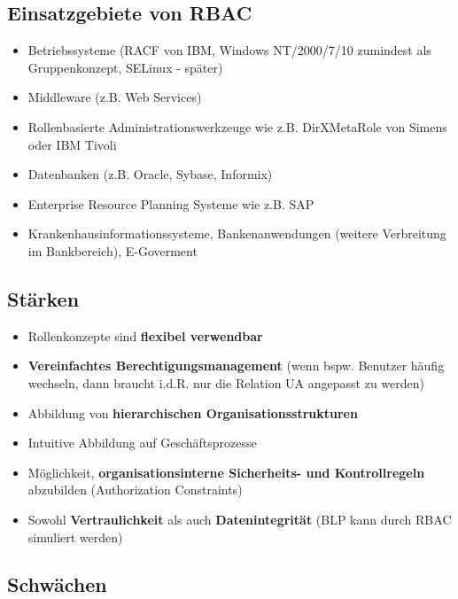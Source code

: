 \documentclass[openany]{book}
\begin{document}
\subsection{Einsatzgebiete von RBAC}

\begin{itemize}
    \item Betriebssysteme (RACF von IBM, Windows NT/2000/7/10 zumindest als Gruppenkonzept, SELinux - später)
    \item Middleware (z.B. Web Services)
    \item Rollenbasierte Administrationswerkzeuge wie z.B. DirXMetaRole von Simens oder IBM Tivoli
    \item Datenbanken (z.B. Oracle, Sybase, Informix)
    \item Enterprise Resource Planning Systeme wie z.B. SAP
    \item Krankenhausinformationssysteme, Bankenanwendungen (weitere Verbreitung im Bankbereich), E-Goverment
\end{itemize}

\subsection{Stärken}

\begin{itemize}
    \item Rollenkonzepte sind \textbf{flexibel verwendbar}
    \item \textbf{Vereinfachtes Berechtigungsmanagement} (wenn bspw. Benutzer häufig wechseln, dann braucht i.d.R. nur die Relation UA angepasst zu werden)
    \item Abbildung von \textbf{hierarchischen Organisationsstrukturen}
    \item Intuitive Abbildung auf Geschäftsprozesse
    \item Möglichkeit, \textbf{organisationsinterne Sicherheits- und Kontrollregeln} abzubilden (Authorization Constraints)
    \item Sowohl \textbf{Vertraulichkeit} als auch \textbf{Datenintegrität} (BLP kann durch RBAC simuliert werden)
\end{itemize}

\subsection{Schwächen}
\end{document}

